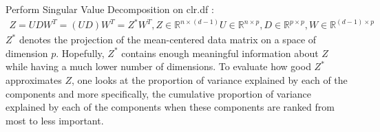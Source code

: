 \documentclass[a4paper,oneside,12pt,titlepage]{article}\usepackage[]{graphicx}\usepackage[]{color}
\begin{document}
Perform Singular Value Decomposition on clr.df : 
\begin{align}
Z = UDW^T  = (UD)W^T = Z^{*}W^T,Z \in \mathbb{R}^{n\times(d-1)} U \in \mathbb{R}^{n\times p}, D \in \mathbb{R}^{p\times p}, W \in \mathbb{R}^{(d-1)\times p}
\end{align}
$Z^*$ denotes the projection of the mean-centered data matrix on a space of dimension $p$. Hopefully, $Z^*$ contains enough meaningful information about $Z$ while having a much lower number of dimensions. To evaluate how good $Z^*$ approximates $Z$, one looks at the proportion of variance explained by each of the components and more specifically, the cumulative proportion of variance explained by each of the components when these components are ranked from most to less important.
\end{document}
